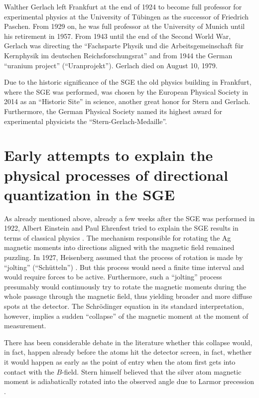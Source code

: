 \documentclass[12pt]{article}
\begin{document}
Walther Gerlach left Frankfurt at the end of 1924 to become full professor for experimental physics at the University of Tübingen as the successor of Friedrich Paschen. From 1929 on, he was full professor at the University of Munich until his retirement in 1957. From 1943 until the end of the Second World War, Gerlach was directing the ``Fachsparte Physik und die Arbeitsgemeinschaft für Kernphysik im deutschen Reichsforschungsrat'' and from 1944 the German ``uranium project'' (``Uranprojekt''). Gerlach died on August 10, 1979. 

Due to the historic significance of the SGE the old physics building in Frankfurt, where the SGE was performed, was chosen by the European Physical Society in 2014 as an ``Historic Site'' in science, another great honor for Stern and Gerlach. Furthermore, the German Physical Society named its highest award for experimental physicists the ``Stern-Gerlach-Medaille''.

\section{Early attempts to explain the physical processes of directional quantization in the SGE}

As already mentioned above, already a few weeks after the SGE was performed in 1922, Albert Einstein and Paul Ehrenfest tried to explain the SGE results in terms of classical physics \citep{EinsteinAEtAl1922Bemerkungen}. The mechanism responsible for rotating the Ag magnetic moments into directions aligned with the magnetic field remained puzzling. In 1927, Heisenberg  assumed that the process of rotation is made by ``jolting'' (``Schütteln'') \citep{HeisenbergW1927Inhalt}. But this process would need a finite time interval and would require forces to be active. Furthermore, such a ``jolting'' process presumably would continuously try to rotate the magnetic moments during the whole passage through the magnetic field, thus yielding broader and more diffuse spots at the detector. The Schrödinger equation in its standard interpretation, however, implies a sudden ``collapse'' of the magnetic moment at the moment of measurement. 

There has been considerable debate in the literature whether this collapse would, in fact, happen already before the atoms hit the detector screen, in fact, whether it would happen as early as the point of entry when the atom first gets into contact with the $B$-field. Stern himself believed that the silver atom magnetic moment is adiabatically rotated into the observed angle due to Larmor precession \citep{PhippsTEtal1932Einstellung}.  
\end{document}
